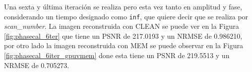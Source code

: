Una sexta y última iteración se realiza pero esta vez tanto en amplitud y fase, considerando un tiempo designado como \texttt{inf}, que quiere decir que se realiza por \textit{scan\_number}. La imagen reconstruida con CLEAN se puede ver en la Figura \ref{fig:phasecal_6ter} que tiene un PSNR de 217.0193 y un NRMSE de 0.986210, por otro lado la imagen reconstruida con MEM se puede observar en la Figura \ref{fig:phasecal_6iter_gpuvmem} done esta tiene un PSNR de 219.5513 y un NRMSE de 0.705273. 

\begin{figure}[!ht]
 \centering
    \vspace{0.3cm}

\end{figure}

